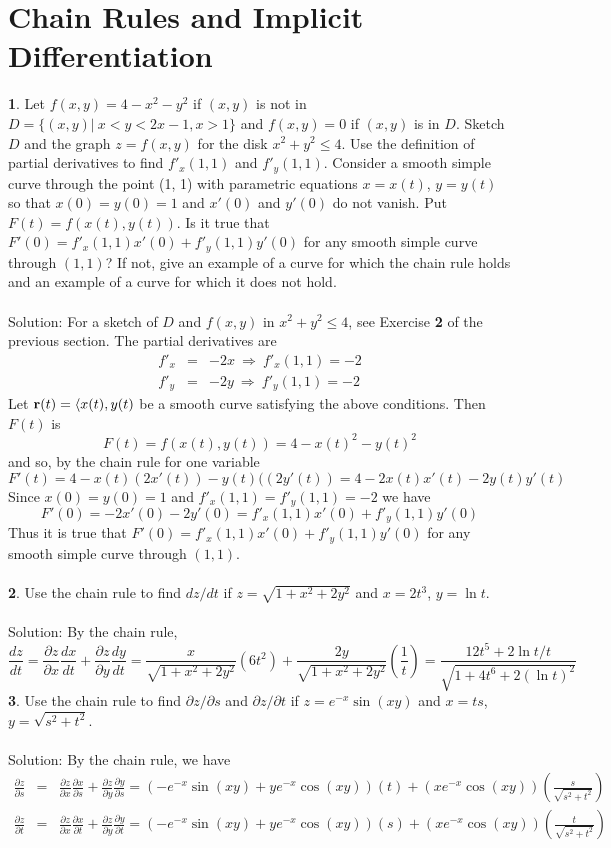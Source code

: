 \documentclass[12pt]{amsbook}
\newcommand{\la}{\langle}
\begin{document}
\section{Chain Rules and Implicit Differentiation}
\noindent
{\small\bf 1}. Let $f(x,y)=4-x^2-y^2$ if $(x, y)$ is not in $D = \{(x, y)| \ x < y < 2x-1 , x >
1\}$ and $f(x, y) = 0$ if $(x, y)$ is in $D$. Sketch $D$ and the graph $z = f(x, y)$ for
the disk $x^2+y^2\leq 4$. Use the definition of partial derivatives to find $f'_x(1,1)$ and $f'_y(1,1)$. Consider a smooth simple curve through the point
(1, 1) with parametric equations $x = x(t)$, $y = y(t)$ so that $x(0) = y(0) = 1$
and $x'(0)$ and $y'(0)$ do not vanish. Put $F(t) = f(x(t), y(t))$. Is it true that $F'(0)=f'_x(1,1)x'(0)+f'_y(1,1)y'(0)$ for any smooth simple curve through
$(1, 1)$? If not, give an example of a curve for which the chain rule holds and
an example of a curve for which it does not hold.
\\
\\
{\sc Solution}: For a sketch of $D$ and $f(x,y)$ in $x^2+y^2\leq 4$, see Exercise {\bf 2} of the previous section. The partial derivatives are
\begin{eqnarray*}
f'_x&=& -2x \ \Rightarrow \ f'_x(1,1)=-2 \\
f'_y&=& -2y \ \Rightarrow \ f'_y(1,1)=-2 
\end{eqnarray*}
Let ${\bf r}(t)=\la x(t),y(t)$ be a smooth curve satisfying the above conditions. Then $F(t)$ is 
$$F(t)=f(x(t),y(t))=4-x(t)^2-y(t)^2$$
and so, by the chain rule for one variable
$$F'(t)=4-x(t)(2x'(t))-y(t)((2y'(t))=4-2x(t)x'(t)-2y(t)y'(t)$$
Since $x(0)=y(0)=1$ and $f'_x(1,1)=f'_y(1,1)=-2$ we have
$$F'(0)=-2x'(0)-2y'(0)=f'_x(1,1)x'(0)+f'_y(1,1)y'(0)$$
Thus it is true that $F'(0)=f'_x(1,1)x'(0)+f'_y(1,1)y'(0)$ for any smooth simple curve through
$(1, 1)$.
\\
\\
{\small\bf 2}. Use the chain rule to find $dz/dt$ if $z=\sqrt{1+x^2+2y^2}$ and $x=2t^3$, $y=\ln t$.
\\
\\
{\sc Solution}: By the chain rule,
$$\frac{dz}{dt}=\frac{\partial z}{\partial x}\frac{dx}{dt}+\frac{\partial z}{\partial y}\frac{dy}{dt}=\frac{x}{\sqrt{1+x^2+2y^2}}(6t^2)+\frac{2y}{\sqrt{1+x^2+2y^2}}(\frac{1}{t})=\frac{12t^5+2\ln t/t}{\sqrt{1+4t^6+2(\ln t)^2}}$$
{\small\bf 3}. Use the chain rule to find $\partial z/\partial s$ and $\partial z/\partial t$ if $z=e^{-x}\sin(xy)$ and $x = ts$, $y=\sqrt{s^2+t^2}$.
\\
\\
{\sc Solution}: By the chain rule, we have
\begin{eqnarray*}
\frac{\partial z}{\partial s}&=&\frac{\partial z}{\partial x}\frac{\partial x}{\partial s}+\frac{\partial z}{\partial y}\frac{\partial y}{\partial s}=(-e^{-x}\sin(xy)+ye^{-x}\cos(xy))(t)+(xe^{-x}\cos(xy))(\frac{s}{\sqrt{s^2+t^2}}) \\
\frac{\partial z}{\partial t}&=&\frac{\partial z}{\partial x}\frac{\partial x}{\partial t}+\frac{\partial z}{\partial y}\frac{\partial y}{\partial t}=(-e^{-x}\sin(xy)+ye^{-x}\cos(xy))(s)+(xe^{-x}\cos(xy))(\frac{t}{\sqrt{s^2+t^2}})
\end{eqnarray*}
\end{document}
